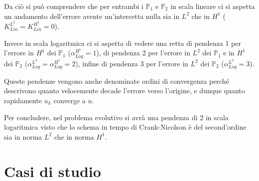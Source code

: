\documentclass{article}
\begin{document}
            Da ciò si può comprendere che per entrambi i $\mathbb P_1$ e $\mathbb P_2$ in scala lineare ci si aspetta un andamento dell'errore avente un'intercetta nulla sia in $L^2$ che in $H^1$ ($K^{L^2}_{Lin}=K^{H^1}_{Lin}=0$).
            
            Invece in scala logaritmica ci si aspetta di vedere una retta di pendenza 1 per l'errore in $H^1$ dei $\mathbb P_1$ ($\alpha^{H^1}_{Log}=1$), di pendenza 2 per l'errore in $L^2$ dei $\mathbb P_1$ e in $H^1$ dei $\mathbb P_2$ ($\alpha^{L^2}_{Log}=\alpha^{H^1}_{Log}=2$), infine di pendenza 3 per l'errore in $L^2$ dei $\mathbb P_2$ ($\alpha^{L^2}_{Log}=3$).

            Queste pendenze vengono anche denominate ordini di convergenza perché descrivono quanto velocemente decade l'errore verso l'origine, e dunque quanto rapidamente $u_h$ converge a $u$.

            Per concludere, nel problema evolutivo si avrà una pendenza di 2 in scala logaritmica visto che lo schema in tempo di Crank-Nicolson è del second'ordine sia in norma $L^2$ che in norma $H^1$.



    \section{Casi di studio}
\end{document}
